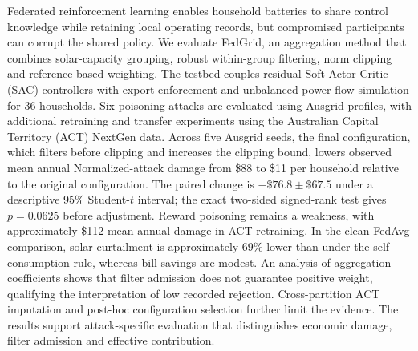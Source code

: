 Federated reinforcement learning enables household batteries to share control knowledge while retaining local operating records, but compromised participants can corrupt the shared policy. We evaluate FedGrid, an aggregation method that combines solar-capacity grouping, robust within-group filtering, norm clipping and reference-based weighting. The testbed couples residual Soft Actor-Critic (SAC) controllers with export enforcement and unbalanced power-flow simulation for 36 households. Six poisoning attacks are evaluated using Ausgrid profiles, with additional retraining and transfer experiments using the Australian Capital Territory (ACT) NextGen data. Across five Ausgrid seeds, the final configuration, which filters before clipping and increases the clipping bound, lowers observed mean annual Normalized-attack damage from \$88 to \$11 per household relative to the original configuration. The paired change is $-\$76.8\pm\$67.5$ under a descriptive 95\% Student-$t$ interval; the exact two-sided signed-rank test gives $p=0.0625$ before adjustment. Reward poisoning remains a weakness, with approximately \$112 mean annual damage in ACT retraining. In the clean FedAvg comparison, solar curtailment is approximately 69\% lower than under the self-consumption rule, whereas bill savings are modest. An analysis of aggregation coefficients shows that filter admission does not guarantee positive weight, qualifying the interpretation of low recorded rejection. Cross-partition ACT imputation and post-hoc configuration selection further limit the evidence. The results support attack-specific evaluation that distinguishes economic damage, filter admission and effective contribution.
